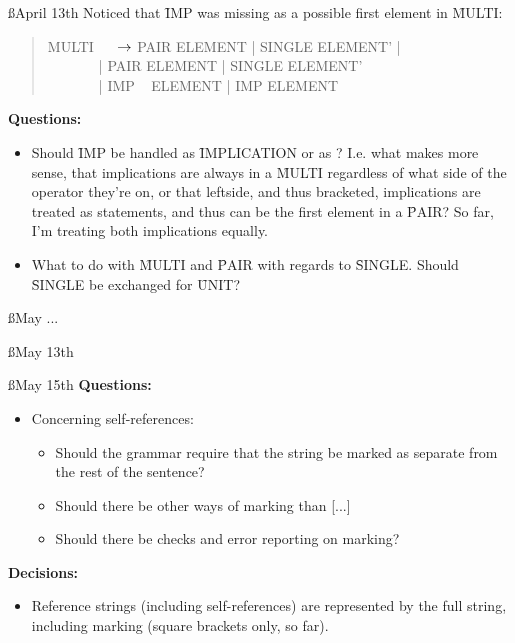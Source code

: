 \documentclass[a4paper]{article}
\begin{document}
\ss{April 13th}
Noticed that \f{IMP} was missing as a possible first element in \f{MULTI}:
\begin{quote}
\ttfamily
MULTI \(~~~~~~\)$\rightarrow$ PAIR \: ELEMENT |
                      SINGLE  ELEMENT' |\\
\(~~~~~~~~~~~~~~~\) | PAIR  ELEMENT  |
                      SINGLE  ELEMENT'\\
\(~~~~~~~~~~~~~~~\) | IMP ~ ELEMENT  |
                      IMP  ELEMENT\\
\end{quote}

{\bf Questions:}
\begin{itemize}
    \item Should \f{IMP} be handled as \f{IMPLICATION} or as ? I.e.
    what makes more sense, that implications are always in a \f{MULTI} 
    regardless of what side of the operator they're on, or that leftside,
    and thus bracketed, implications are treated as statements, and thus 
    can be the first element in a \f{PAIR}?
    So far, I'm treating both implications equally.

    \item What to do with \f{MULTI} and \f{PAIR} with regards to \f{SINGLE}.
    Should \f{SINGLE} be exchanged for \f{UNIT}?
\end{itemize}

\ss{May ...}

\ss{May 13th}

\ss{May 15th}
{\bf Questions:}
  \begin{itemize}
    \item Concerning self-references:
      \begin{itemize}
        \item Should the grammar require that the string be marked as 
        separate from the rest of the sentence?
        \item Should there be other ways of marking than [...]
        \item Should there be checks and error reporting on marking?
      \end{itemize}
  \end{itemize}

{\bf Decisions:}
  \begin{itemize}
    \item Reference strings (including self-references) are represented by 
    the full string, including marking (square brackets only, so far).
  \end{itemize}

\label{LastBody}
\end{document}
